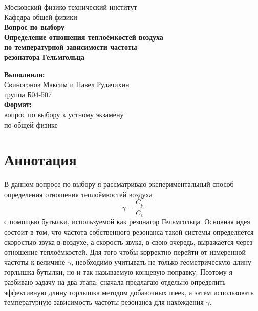 \documentclass[a4paper,12pt]{article}
\begin{document}
	
	\begin{titlepage}
		\begin{center}
			{\large Московский физико-технический институт}\\[0.4cm]
			{\large Кафедра общей физики}\\[1.8cm]
			
			{\Large \textbf{Вопрос по выбору}}\\[0.5cm]
			{\LARGE \textbf{Определение отношения теплоёмкостей воздуха}}\\[0.2cm]
			{\LARGE \textbf{по температурной зависимости частоты}}\\[0.2cm]
			{\LARGE \textbf{резонатора Гельмгольца}}\\[1.8cm]
			
			\begin{flushright}
				\begin{minipage}{0.48\textwidth}
					\textbf{Выполнили:}\\
					Свиногонов Максим и Павел Рудачихин\\
					группа Б04-507\\[0.4cm]
					\textbf{Формат:}\\
					вопрос по выбору к устному экзамену\\
					по общей физике
				\end{minipage}
			\end{flushright}
			
			\vfill
		\end{center}
	\end{titlepage}
	
	\tableofcontents
	\newpage
	
	\section*{Аннотация}
	
	В данном вопросе по выбору я рассматриваю экспериментальный способ определения отношения теплоёмкостей воздуха
	\[
	\gamma=\frac{C_p}{C_v}
	\]
	с помощью бутылки, используемой как резонатор Гельмгольца. Основная идея состоит в том, что частота собственного резонанса такой системы определяется скоростью звука в воздухе, а скорость звука, в свою очередь, выражается через отношение теплоёмкостей. Для того чтобы корректно перейти от измеренной частоты к величине \(\gamma\), необходимо учитывать не только геометрическую длину горлышка бутылки, но и так называемую концевую поправку. Поэтому я разбиваю задачу на два этапа: сначала предлагаю отдельно определить эффективную длину горлышка методом добавочных шеек, а затем использовать температурную зависимость частоты резонанса для нахождения \(\gamma\).
	
\end{document}
